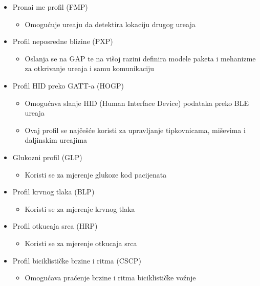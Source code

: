 \begin{itemize}
	\item Prona\dj i me profil (FMP)
	\begin{itemize}
		\item Omogu\'{c}uje ure\dj aju da detektira lokaciju drugog ure\dj aja
	\end{itemize}
	
	\item Profil neposredne blizine (PXP)
	\begin{itemize}
		\item Oslanja se na GAP te na vi\v{s}oj razini definira modele paketa i mehanizme za otkrivanje ure\dj aja i samu komunikaciju
	\end{itemize}
	
	\item Profil HID preko GATT-a (HOGP)
	\begin{itemize}
		\item Omogu\'{c}ava slanje HID (Human Interface Device) podataka preko BLE ure\dj aja
		\item Ovaj profil se naj\v{c}e\v{s}\'{c}e koristi za upravljanje tipkovnicama, mi\v{s}evima i daljinskim ure\dj ajima
	\end{itemize}
	
	\item Glukozni profil (GLP)
	\begin{itemize}
		\item Koristi se za mjerenje glukoze kod pacijenata
	\end{itemize}
	
	\item Profil krvnog tlaka (BLP)
	\begin{itemize}
		\item Koristi se za mjerenje krvnog tlaka
	\end{itemize}
	
	\item Profil otkucaja srca (HRP)
	\begin{itemize}
		\item Koristi se za mjerenje otkucaja srca
	\end{itemize}
	
	\item Profil biciklisti\v{c}ke brzine i ritma (CSCP)
	\begin{itemize}
		\item Omogu\'{c}ava pra\'{c}enje brzine i ritma biciklisti\v{c}ke vo\v{z}nje
	\end{itemize}
\end{itemize}

